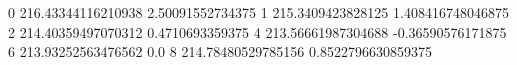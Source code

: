 0 216.43344116210938 2.50091552734375
1 215.3409423828125 1.408416748046875
2 214.40359497070312 0.4710693359375
4 213.56661987304688 -0.36590576171875
6 213.93252563476562 0.0
8 214.78480529785156 0.8522796630859375
